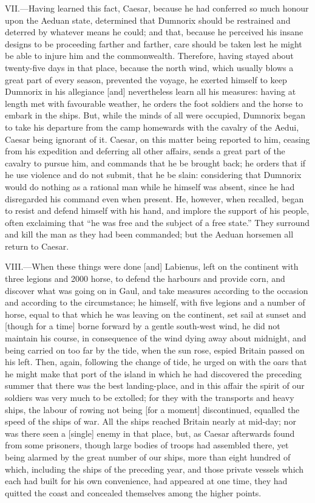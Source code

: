 VII.—Having learned this fact, Caesar, because he had conferred so much
honour upon the Aeduan state, determined that Dumnorix should be
restrained and deterred by whatever means he could; and that, because he
perceived his insane designs to be proceeding farther and farther, care
should be taken lest he might be able to injure him and the
commonwealth. Therefore, having stayed about twenty-five days in that
place, because the north wind, which usually blows a great part of every
season, prevented the voyage, he exerted himself to keep Dumnorix in his
allegiance [and] nevertheless learn all his measures: having at length
met with favourable weather, he orders the foot soldiers and the horse
to embark in the ships. But, while the minds of all were occupied,
Dumnorix began to take his departure from the camp homewards with the
cavalry of the Aedui, Caesar being ignorant of it. Caesar, on this
matter being reported to him, ceasing from his expedition and deferring
all other affairs, sends a great part of the cavalry to pursue him, and
commands that he be brought back; he orders that if he use violence and
do not submit, that he be slain: considering that Dumnorix would do
nothing as a rational man while he himself was absent, since he had
disregarded his command even when present. He, however, when recalled,
began to resist and defend himself with his hand, and implore the
support of his people, often exclaiming that ``he was free and the
subject of a free state.'' They surround and kill the man as they had
been commanded; but the Aeduan horsemen all return to Caesar.

VIII.—When these things were done [and] Labienus, left on the continent
with three legions and 2000 horse, to defend the harbours and provide
corn, and discover what was going on in Gaul, and take measures
according to the occasion and according to the circumstance; he himself,
with five legions and a number of horse, equal to that which he was
leaving on the continent, set sail at sunset and [though for a time]
borne forward by a gentle south-west wind, he did not maintain his
course, in consequence of the wind dying away about midnight, and being
carried on too far by the tide, when the sun rose, espied Britain passed
on his left. Then, again, following the change of tide, he urged on with
the oars that he might make that port of the island in which he had
discovered the preceding summer that there was the best landing-place,
and in this affair the spirit of our soldiers was very much to be
extolled; for they with the transports and heavy ships, the labour of
rowing not being [for a moment] discontinued, equalled the speed of the
ships of war. All the ships reached Britain nearly at mid-day; nor was
there seen a [single] enemy in that place, but, as Caesar afterwards
found from some prisoners, though large bodies of troops had assembled
there, yet being alarmed by the great number of our ships, more than
eight hundred of which, including the ships of the preceding year, and
those private vessels which each had built for his own convenience, had
appeared at one time, they had quitted the coast and concealed
themselves among the higher points.

